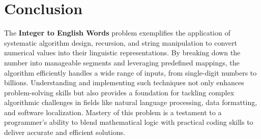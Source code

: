 \section*{Conclusion}

The \textbf{Integer to English Words} problem exemplifies the application of systematic algorithm design, recursion, and string manipulation to convert numerical values into their linguistic representations. By breaking down the number into manageable segments and leveraging predefined mappings, the algorithm efficiently handles a wide range of inputs, from single-digit numbers to billions. Understanding and implementing such techniques not only enhances problem-solving skills but also provides a foundation for tackling complex algorithmic challenges in fields like natural language processing, data formatting, and software localization. Mastery of this problem is a testament to a programmer's ability to blend mathematical logic with practical coding skills to deliver accurate and efficient solutions.

\printindex

% 
% 
% 
% 
% 